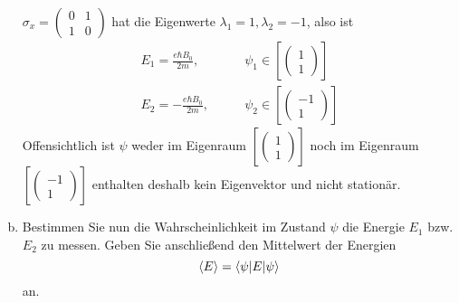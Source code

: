 \documentclass{scrartcl}
\newcommand{\vecz}[2]{\begin{pmatrix}#1 \\ #2\end{pmatrix}}
\begin{document}
\begin{enumerate}[a)]
$\sigma_x = \begin{pmatrix}0&1\\1&0\end{pmatrix}$ hat die Eigenwerte $\lambda_1 = 1, \lambda_2 = -1$, also ist
\begin{align*}
E_1 =  \frac{e\hbar B_0}{2m}, \qquad& \psi_1 \in \left[\vecz 11 \right]\\
E_2 = -\frac{e\hbar B_0}{2m}, \qquad& \psi_2 \in \left[\vecz {-1}1 \right]
\end{align*}
Offensichtlich ist $\psi$ weder im Eigenraum $\left[\vecz 11 \right]$ noch im Eigenraum $\left[\vecz {-1}1 \right]$ enthalten deshalb kein Eigenvektor und nicht stationär.


\item Bestimmen Sie nun die Wahrscheinlichkeit im Zustand $\psi$ die Energie $E_1$ bzw. $E_2$ zu messen. Geben Sie anschließend den Mittelwert der Energien
\[\braket{E} = \braket{\psi|E|\psi}\]
an.



\end{enumerate}
\end{document}
